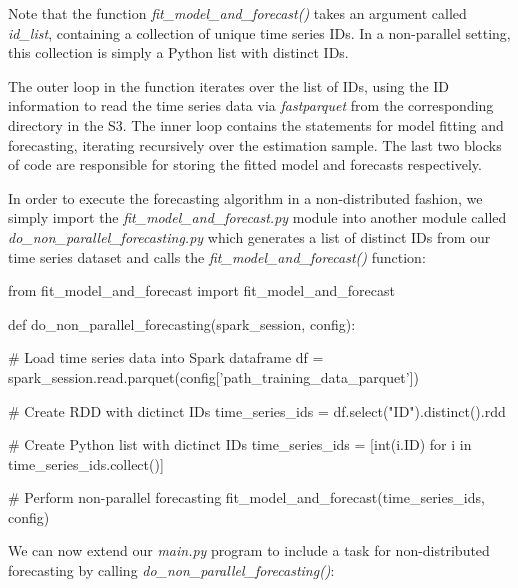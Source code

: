 \documentclass[11pt]{article}
\begin{document}
Note that the function \emph{fit\_model\_and\_forecast()} takes an argument called \emph{id\_list}, containing a collection of unique time series IDs. In a non-parallel setting, this collection is simply a Python list with distinct IDs. 

The outer loop in the function iterates over the list of IDs, using the ID information to read the time series data via \emph{fastparquet} from the corresponding directory in the S3. The inner loop contains the statements for model fitting and forecasting, iterating recursively over the estimation sample. The last two blocks of code are responsible for storing the fitted model and forecasts respectively. 

\begin{sloppypar}
In order to execute the forecasting algorithm in a non-distributed fashion, we simply import the \emph{fit\_model\_and\_forecast.py} module into another module called \emph{do\_non\_parallel\_forecasting.py} which generates a list of distinct IDs from our time series dataset and calls the \emph{fit\_model\_and\_forecast()} function:
\end{sloppypar}

\begin{python}[caption={\emph{do\_non\_parallel\_forecasting.py}}]
from fit_model_and_forecast import fit_model_and_forecast

def do_non_parallel_forecasting(spark_session, config):

    # Load time series data into Spark dataframe
    df = spark_session.read.parquet(config['path_training_data_parquet'])

    # Create RDD with dictinct IDs
    time_series_ids = df.select("ID").distinct().rdd

    # Create Python list with dictinct IDs
    time_series_ids = [int(i.ID) for i in time_series_ids.collect()]

    # Perform non-parallel forecasting
    fit_model_and_forecast(time_series_ids, config)
\end{python}

We can now extend our \emph{main.py} program to include a task for non-distributed forecasting by calling \emph{do\_non\_parallel\_forecasting()}:
\end{document}
